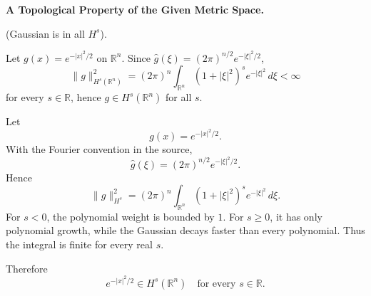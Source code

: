 \begin{problem}[CP-II-0529]
\label{prob:cp-ii-0529}
\textbf{A Topological Property of the Given Metric Space.}

\hspace*{1.5em}(Gaussian is in all $H^s$).

Let $g(x)=e^{-|x|^2/2}$ on $\mathbb R^n$. Since $\widehat g(\xi)=(2\pi)^{n/2}e^{-|\xi|^2/2}$,
\[
\|g\|_{H^s(\mathbb R^n)}^2=(2\pi)^n\int_{\mathbb R^n}(1+|\xi|^2)^s e^{-|\xi|^2}\,d\xi<\infty
\]
for every $s\in\mathbb R$, hence $g\in H^s(\mathbb R^n)$ for all $s$.

\bigskip
\end{problem}

\begin{solution}
Let
\[
g(x)=e^{-|x|^2/2}.
\]
With the Fourier convention in the source,
\[
\widehat g(\xi)
=
(2\pi)^{n/2}e^{-|\xi|^2/2}.
\]
Hence
\[
\|g\|_{H^s}^2
=
(2\pi)^n
\int_{\mathbb R^n}
(1+|\xi|^2)^s e^{-|\xi|^2}\,d\xi.
\]
For \(s<0\), the polynomial weight is bounded by \(1\). For \(s\ge0\), it has only
polynomial growth, while the Gaussian decays faster than every polynomial. Thus the integral
is finite for every real \(s\).

Therefore
\[
\boxed{
e^{-|x|^2/2}\in H^s(\mathbb R^n)
\quad\text{for every }s\in\mathbb R.
}
\]
\end{solution}


